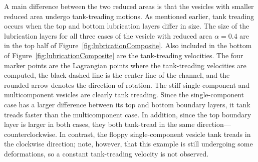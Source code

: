 \documentclass[twoside,twocolumn,9pt]{article}
\begin{document}
A main difference between the two reduced areas is that the vesicles
with smaller reduced area undergo tank-treading motions. As mentioned
earlier, tank treading occurs when the top and bottom lubrication layers
differ in size. The size of the lubrication layers for all three cases
of the vesicle with reduced area $\alpha = 0.4$ are in the top half of
Figure~\ref{fig:lubricationComposite}. Also included in the bottom of
Figure~\ref{fig:lubricationComposite} are the tank-treading velocities.
The four marker points are the Lagrangian points where the tank-treading
velocities are computed, the black dashed line is the center line of the
channel, and the rounded arrow denotes the direction of rotation. The
stiff single-component and multicomponent vesicles are clearly tank
treading. Since the single-component case has a larger difference
between its top and bottom boundary layers, it tank treads faster than
the multicomponent case. In addition, since the top boundary layer is
larger in both cases, they both tank-tread in the same
direction---counterclockwise. In contrast, the floppy single-component
vesicle tank treads in the clockwise direction; note, however, that this
example is still undergoing some deformations, so a constant
tank-treading velocity is not observed.


\end{document}
